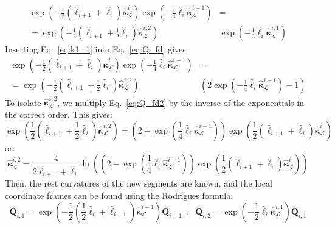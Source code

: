 \documentclass[a4paper, 11pt]{article}
\begin{document}
\begin{align}\label{eq:Q_fd}
    \exp\left(-{\frac{1}{2}(\hat{\ell}_{i+1}+\hat{\ell}_{i})\hat{\boldsymbol{\kappa}}^i_\mathcal{L}}\right)\exp\left(-\frac{1}{4}\hat{\ell}_{i}\hat{\boldsymbol{\kappa}}^{i-1}_\mathcal{L}\right)&=\nonumber\\
    =\exp\left(-\frac{1}{2}(\hat{\ell}_{i+1}+\frac{1}{2}\hat{\ell}_{i})\hat{\boldsymbol{\kappa}}^{i,2}_\mathcal{L}\right)&\exp\left(-\frac{1}{2}\hat{\ell}_i\hat{\boldsymbol{\kappa}}^{i,1}_\mathcal{L}\right)
\end{align}
Inserting Eq.~\ref{eq:k1_1} into Eq.~\ref{eq:Q_fd} gives:
\begin{align}\label{eq:Q_fd2}
    \exp\left(-{\frac{1}{2}(\hat{\ell}_{i+1}+\hat{\ell}_{i})\hat{\boldsymbol{\kappa}}^i_\mathcal{L}}\right)\exp\left(-\frac{1}{4}\hat{\ell}_{i}\hat{\boldsymbol{\kappa}}^{i-1}_\mathcal{L}\right)&=\nonumber\\
    =\exp\left(-\frac{1}{2}(\hat{\ell}_{i+1}+\frac{1}{2}\hat{\ell}_{i})\hat{\boldsymbol{\kappa}}^{i,2}_\mathcal{L}\right)&\left(2\exp\left(-\frac{1}{4}\hat{\ell}_{i}\hat{\boldsymbol{\kappa}}^{i-1}_\mathcal{L}\right)-1\right)
\end{align}
To isolate $\hat{\boldsymbol{\kappa}}^{i,2}_\mathcal{L}$, we multiply Eq.~\ref{eq:Q_fd2} by the inverse of the exponentials in the correct order. This gives:
\begin{equation}
    \label{eq:Q_fd3}
    \exp{\left(\frac{1}{2}(\hat{\ell}_{i+1}+\frac{1}{2}\hat{\ell}_{i})\hat{\boldsymbol{\kappa}}^{i,2}_\mathcal{L}\right)}
    =\left(2-\exp{\left(\frac{1}{4}\hat{\ell}_{i}\hat{\boldsymbol{\kappa}}^{i-1}_\mathcal{L}\right)}\right) \exp{\left(\frac{1}{2}(\hat{\ell}_{i+1}+\hat{\ell}_{i})\hat{\boldsymbol{\kappa}}^i_\mathcal{L}\right)}
\end{equation}
or:
\begin{equation}
    \hat{\boldsymbol{\kappa}}^{i,2}_\mathcal{L}
    =\frac{4}{2\hat{\ell}_{i+1}+\hat{\ell}_i}\ln{\left(\left(2-\exp{\left(\frac{1}{4}\hat{\ell}_{i}\hat{\boldsymbol{\kappa}}^{i-1}_\mathcal{L}\right)}\right) \exp{\left(\frac{1}{2}(\hat{\ell}_{i+1}+\hat{\ell}_{i})\hat{\boldsymbol{\kappa}}^i_\mathcal{L}\right)}\right)}
\end{equation}
Then, the rest curvatures of the new segments are known, and the local coordinate frames can be found using the Rodrigues formula:
\begin{equation}
    \boldsymbol{Q}_{i,1}=\exp\left(-\frac{1}{2}(\frac{1}{2}\hat{\ell}_{i}+\hat{\ell}_{i-1})\hat{\boldsymbol{\kappa}}^{i-1}_\mathcal{L}\right)\boldsymbol{Q}_{i-1}\;\;,\;\;\boldsymbol{Q}_{i,2}=\exp\left(-\frac{1}{2}\hat{\ell}_i\hat{\boldsymbol{\kappa}}^{i,1}_\mathcal{L}\right)\boldsymbol{Q}_{i,1}
\end{equation}
\end{document}
